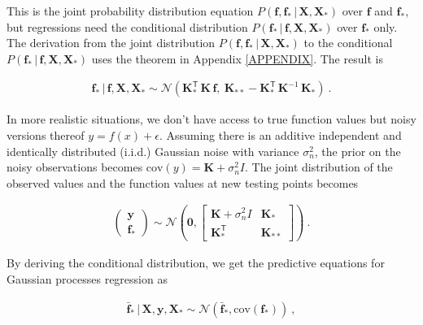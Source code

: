 \documentclass[preprint,12pt]{elsarticle}
\begin{document}
This is the joint probability distribution equation $P(\mathbf{f}, \mathbf{f}_* \, \vert \, \mathbf{X}, \mathbf{X}_*)$ over $\mathbf{f}$ and $\mathbf{f}_*$, but regressions need the conditional distribution $P(\mathbf{f}_* \, \vert \, \mathbf{f}, \mathbf{X}, \mathbf{X}_*)$ over $\mathbf{f}_*$ only. The derivation from the joint distribution $P(\mathbf{f}, \mathbf{f}_* \, \vert \, \mathbf{X}, \mathbf{X}_*)$ to the conditional $P(\mathbf{f}_* \, \vert \, \mathbf{f}, \mathbf{X}, \mathbf{X}_*)$ uses the theorem in Appendix \ref{APPENDIX}. The result is
\begin{ceqn}
    \begin{align}
       \mathbf{f}_* \, \vert \, \mathbf{f}, \mathbf{X}, \mathbf{X}_* \sim \mathcal{N} \left(\mathbf{K}_*^\mathsf{T} \, \mathbf{K} \, \mathbf{f}, \: \mathbf{K}_{**} - \mathbf{K}_*^\mathsf{T} \, \mathbf{K}^{-1} \, \mathbf{K}_* \right) \ . \nonumber
    \end{align}
\end{ceqn}
In more realistic situations, we don't have access to true function values but noisy versions thereof $y = f(x) + \epsilon$. Assuming there is an additive independent and identically distributed (i.i.d.) Gaussian noise with variance $\sigma_n^2$, the prior on the noisy observations becomes $\text{cov}(y) = \mathbf{K} + \sigma_n^2 {I}$. The joint distribution of the observed values and the function values at new testing points becomes
\begin{ceqn}
    \begin{align}
       \begin{pmatrix}\mathbf{y} \\ \mathbf{f}_*\end{pmatrix} \sim\mathcal{N}\left(\mathbf{0}, \begin{bmatrix}\mathbf{K} + \sigma_n^2 {I} & \mathbf{K}_* \\ \mathbf{K}_*^\mathsf{T} & \mathbf{K}_{**}\end{bmatrix}\right) \ . \nonumber
    \end{align}
\end{ceqn}
By deriving the conditional distribution, we get the predictive equations for Gaussian processes regression as
\begin{ceqn}
    \begin{align}
       \mathbf{\bar{f}_*} \, \vert \, \mathbf{X}, \mathbf{y}, \mathbf{X}_* \sim \mathcal{N} \left(\mathbf{\bar{f}_*}, \text{cov}(\mathbf{f}_*)\right) \ , \nonumber
    \end{align}
\end{ceqn}
\end{document}
